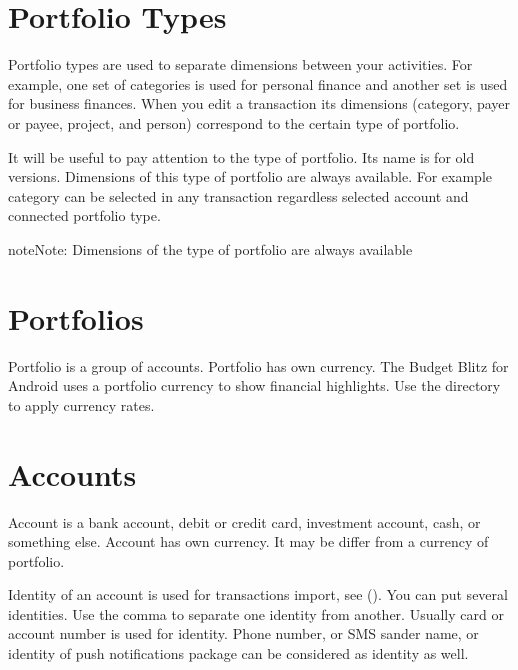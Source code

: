 \documentclass[a4paper,10pt,english]{sphinxmanual}
\begin{document}
\section{Portfolio Types}
\label{\detokenize{directories:portfolio-types}}
Portfolio types are used to separate dimensions between your activities. For example, one set of
categories is used for personal finance and another set is used for business finances. When you
edit a transaction its dimensions (category,  payer or payee, project, and person) correspond
to the certain type of portfolio.

\noindent{}
\noindent{}
\noindent{}

It will be useful to pay attention to the  type of portfolio. Its name is 
for old versions. Dimensions of this type of portfolio are always available. For example 
category can be selected in any transaction regardless selected account and connected portfolio type.

\begin{sphinxadmonition}{note}{Note:}
Dimensions of the  type of portfolio are always available
\end{sphinxadmonition}


\section{Portfolios}
\label{\detokenize{directories:portfolios}}
Portfolio is a group of accounts. Portfolio has own currency. The Budget Blitz for Android uses a portfolio currency
to show financial highlights. Use the  directory to apply currency rates.


\section{Accounts}
\label{\detokenize{directories:accounts}}
Account is a bank account, debit or credit card, investment account, cash, or something else.
Account has own currency. It may be differ from a currency of portfolio.

Identity of an account is used for transactions import, see {\hyperref[\detokenize{import:chapter-import}]{}} ().
You can put several identities. Use the comma to separate one identity from another.
Usually card or account number is used for identity. Phone number, or SMS sander name,
or identity of push notifications package can be considered as identity as well.
\end{document}
